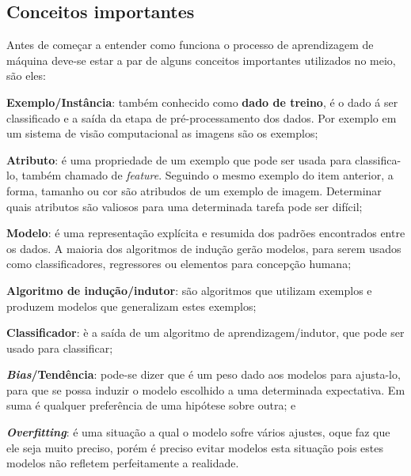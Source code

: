  \subsection{Conceitos importantes}
 \label{subsec:conceitos}
 Antes de começar a entender como funciona o processo de aprendizagem de máquina deve-se estar a par de alguns conceitos importantes 
 utilizados no meio, são eles:
  \begin{alineas}
  	\item \textbf{Exemplo/Instância}: também conhecido como \textbf{dado de treino}, é o dado á ser classificado e a saída da etapa de pré-processamento dos dados.
	Por exemplo em um sistema de visão computacional as imagens são os exemplos;
	\item \textbf{Atributo}: é uma propriedade de um exemplo que pode ser usada para classifica-lo, também chamado de \textit{feature}. Seguindo o mesmo exemplo do item anterior,
	a forma, tamanho ou cor são atribudos de um exemplo de imagem. Determinar quais atributos são valiosos para uma determinada tarefa pode 
	ser difícil;
	\item \textbf{Modelo}: é uma representação explícita e resumida dos padrões encontrados entre os dados. A maioria dos algoritmos de indução gerão modelos,
	para serem usados como classificadores, regressores ou elementos para concepção humana;
	\item \textbf{Algoritmo de indução/indutor}: são algoritmos que utilizam exemplos e produzem modelos que generalizam estes exemplos;
	\item \textbf{Classificador}: è a saída de um algoritmo de aprendizagem/indutor, que pode ser usado para classificar;	
	\item \textbf{\textit{Bias}/Tendência}: pode-se dizer que é um peso dado aos modelos para ajusta-lo, para que se possa induzir o modelo escolhido
	 a uma determinada expectativa. Em suma é qualquer preferência de uma hipótese sobre outra; e
	 \item \textbf{\textit{Overfitting}}: é uma situação a qual o modelo sofre vários ajustes, oque faz que ele seja muito preciso, 
	 porém é preciso evitar modelos  esta situação pois estes modelos não refletem perfeitamente a realidade.
  \end{alineas}  
